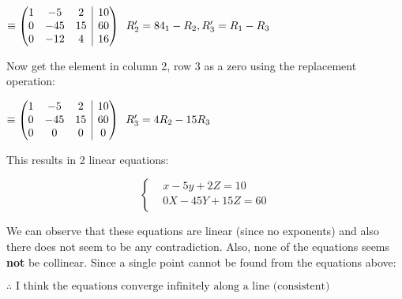 \documentclass[12pt]{book}
\makeatletter
\newenvironment{amatrix}[1]{%
  \left(\begin{array}{@{}*{#1}{c}|c@{}}
}{%
  \end{array}\right)
}
\makeatother
\begin{document}
\begin{enumerate}
$
\equiv
\begin{amatrix}{3}
   1 & -5 & 2 & 10\\  0 & -45 & 15 & 60\\ 0 & -12 & 4  & 16
 \end{amatrix}
 \text{\space \space } R'_2 = 84_1-R_2, R'_3=R_1-R_3
$

\vspace{0.4cm}
Now get the element in column 2, row 3 as a zero using the replacement operation:
\vspace{0.4cm}

$
\equiv
\begin{amatrix}{3}
   1 & -5 & 2 & 10\\  0 & -45 & 15 & 60\\ 0 & 0 & 0 & 0
 \end{amatrix}
 \text{\space \space } R'_3 = 4R_2 - 15R_3
$

\vspace{0.4cm}
This results in 2 linear equations:

\[ \begin{cases} 
  & x-5y+2Z=10 \\
  & 0X-45Y+15Z=60 \\
\end{cases}
\]

\vspace{0.3cm}
We can observe that these equations are linear (since no exponents) 
and also there does not seem to be any contradiction. Also, none of the 
equations seems \textbf{not} be collinear. Since a single point cannot be 
found from the equations above:

\vspace{0.3cm}
\begin{center}
  $\boxed{\therefore \text{ I think the equations converge infinitely along a line (consistent)}}$
\end{center}

\newpage



\end{enumerate}
\end{document}
